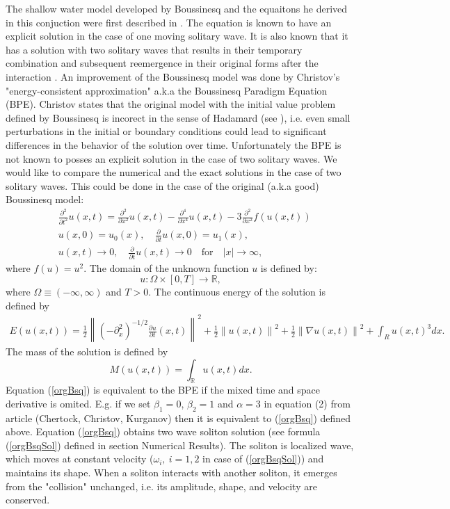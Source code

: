 \documentclass[%
 aip,
cp,  
 amsmath,amssymb,
 reprint,
]{iopconfser}
\newcommand{\be}{\begin{equation}}
\newcommand{\ee}{\end{equation}}
\newcommand{\rf}[1]{(\ref{#1})}
\newcommand{\RR}{\mathbb{R}}
\begin{document}
The shallow water model developed by Boussinesq and the equaitons he derived in this conjuction were first described in \cite{ref0}. The equation is known to have an explicit solution in the case of one moving solitary wave. It is also known that it has a solution with two solitary waves that results in their temporary combination and subsequent reemergence in their original forms after the interaction \cite{exactSol1, exactSol2}. An improvement of the Boussinesq model was done by Christov's "energy-consistent approximation" \cite{ref1} a.k.a the Boussinesq Paradigm Equation (BPE). Christov states that the original model with the initial value problem defined by Boussinesq is incorect in the sense of Hadamard (see \cite{ref1}), i.e. even small perturbations in the initial or boundary conditions could lead to significant differences in the behavior of the solution over time. Unfortunately the BPE is not known to posses an explicit solution in the case of two solitary waves. We would like to compare the numerical and the exact solutions in the case of two solitary waves. This could be done in the case of the original (a.k.a good) Boussinesq model:
\begin{align}\label{orgBsq}
&\frac{\partial^2 }{\partial t^2}u(x,t)= \frac{\partial^2}{\partial x^2}u(x,t) -  \frac{\partial^4}{\partial x^4}u(x,t) - 3\frac{\partial^2}{\partial x^2} f(u(x,t))
\\
&u(x,0) = u_0(x), \quad \frac{\partial }{\partial t}u(x,0)=u_1(x), \nonumber
\\
&u(x,t) \rightarrow 0, \quad \frac{\partial }{\partial t} u(x, t) \rightarrow 0 \quad \text{for} \quad |x| \rightarrow \infty, \nonumber
\end{align}
where $f(u) = u^2$. The domain of the unknown function $u$ is defined by:
\be
 u:\Omega \times [0, T] \rightarrow \RR,
\ee
where $\Omega \equiv (-\infty, \infty)$ and $T>0$. The continuous energy of the solution is defined by
\begin{eqnarray}\label{con-cont2}
E\left( u(x,t)\right)=	\frac{1}{2} \left\|(-\partial^2_x)^{-1/2} \frac{\partial u}{\partial t}(x,t)\right\|^2 + \frac{1}{2}  \left\|u (x,t)\right\|^2 
+ \frac{1}{2}\left\| \nabla u(x,t) \right\|^2+ \int _{R} u(x,t)^3 dx.
\end{eqnarray}
The mass of the solution is defined by
\begin{equation}\label{intM}
M(u(x,t))=\int_{\RR} u(x,t)dx.
\end{equation}
Equation \rf{orgBsq} is equivalent to the BPE if the mixed time and space derivative is omited. E.g. if we set $\beta_1 = 0$, $\beta_2 = 1$ and $\alpha = 3$ in equation (2) from article \cite{ref21} (Chertock, Christov, Kurganov) then it is equivalent to \rf{orgBsq} defined above. Equation \rf{orgBsq} obtains two wave soliton solution (see formula \rf{orgBsqSol} defined in section Numerical Results).
The soliton is localized wave, which moves at constant velocity ($\omega_i, \: i=1,2$ in case of \rf{orgBsqSol}) and maintains its shape. When a soliton interacts with another soliton, it emerges from the "collision" unchanged, i.e. its amplitude, shape, and velocity are conserved. 
\end{document}
